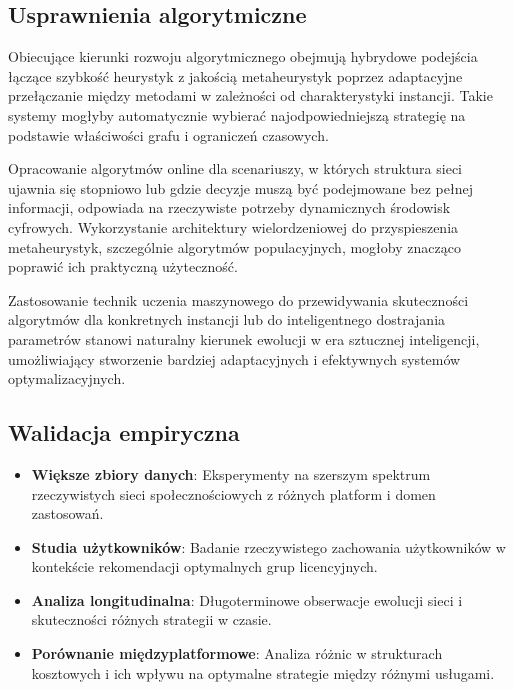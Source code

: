 \subsection{Usprawnienia algorytmiczne}

Obiecujące kierunki rozwoju algorytmicznego obejmują hybrydowe podejścia łączące szybkość heurystyk z jakością metaheurystyk poprzez adaptacyjne przełączanie między metodami w zależności od charakterystyki instancji. Takie systemy mogłyby automatycznie wybierać najodpowiedniejszą strategię na podstawie właściwości grafu i ograniczeń czasowych.

Opracowanie algorytmów online dla scenariuszy, w których struktura sieci ujawnia się stopniowo lub gdzie decyzje muszą być podejmowane bez pełnej informacji, odpowiada na rzeczywiste potrzeby dynamicznych środowisk cyfrowych. Wykorzystanie architektury wielordzeniowej do przyspieszenia metaheurystyk, szczególnie algorytmów populacyjnych, mogłoby znacząco poprawić ich praktyczną użyteczność.

Zastosowanie technik uczenia maszynowego do przewidywania skuteczności algorytmów dla konkretnych instancji lub do inteligentnego dostrajania parametrów stanowi naturalny kierunek ewolucji w era sztucznej inteligencji, umożliwiający stworzenie bardziej adaptacyjnych i efektywnych systemów optymalizacyjnych.

\subsection{Walidacja empiryczna}

\begin{itemize}
\item \textbf{Większe zbiory danych}: Eksperymenty na szerszym spektrum rzeczywistych sieci społecznościowych z różnych platform i domen zastosowań.

\item \textbf{Studia użytkowników}: Badanie rzeczywistego zachowania użytkowników w kontekście rekomendacji optymalnych grup licencyjnych.

\item \textbf{Analiza longitudinalna}: Długoterminowe obserwacje ewolucji sieci i skuteczności różnych strategii w czasie.

\item \textbf{Porównanie międzyplatformowe}: Analiza różnic w strukturach kosztowych i ich wpływu na optymalne strategie między różnymi usługami.
\end{itemize}

